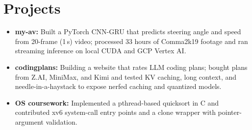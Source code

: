 \documentclass[11pt, letterpaper]{article}
\begin{document}
\section{Projects}
\begin{itemize}
  \item \textbf{my-av:} Built a PyTorch CNN-GRU that predicts steering angle and speed from 20-frame (1\,s) video; processed 33 hours of Comma2k19 footage and ran streaming inference on local CUDA and GCP Vertex AI.
  \item \textbf{codingplans:} Building a website that rates LLM coding plans; bought plans from Z.AI, MiniMax, and Kimi and tested KV caching, long context, and needle-in-a-haystack to expose nerfed caching and quantized models.
  \item \textbf{OS coursework:} Implemented a pthread-based quicksort in C and contributed xv6 system-call entry points and a clone wrapper with pointer-argument validation.
\end{itemize}
\end{document}

